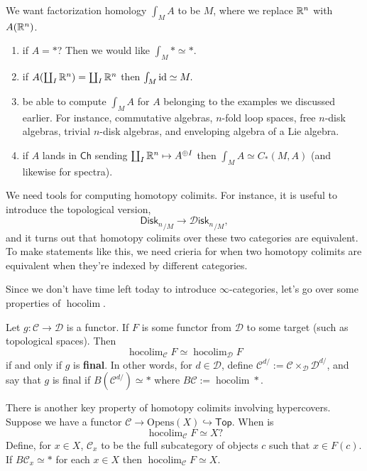 \documentclass{amsart}
\DeclareMathOperator{\hocolim}{hocolim}
\newcommand{\disk}{\mathsf{Disk}_n}
\newcommand{\Disk}{\mathscr{D}\mathsf{isk}_n}
\begin{document}
We want factorization homology $\int_M A$ to be $M$, where we replace $\mathbb{R}^n$
with $A(\mathbb{R}^n)$.
\begin{example}[Desiderata]
    \mbox{}
    \begin{enumerate}
        \item if $A=*$? Then we would like $\int_M* \simeq *$.
        \item if $A(\coprod_I\mathbb{R}^n)=\coprod_I\mathbb{R}^n$ then $\int_M \operatorname{id} \simeq M.$
        \item be able to compute $\int_M A$ for $A$ belonging to the examples
            we discussed earlier. For instance, commutative algebras, $n$-fold
            loop spaces, free $n$-disk algebras, trivial $n$-disk algebras,
            and enveloping algebra of a Lie algebra.
        \item if $A$ lands in $\mathsf{Ch}$ sending $\coprod_I\mathbb{R}^n\mapsto A^{\oplus I}$
            then $\int_M A \simeq C_*(M,A)$ (and likewise for spectra).
    \end{enumerate}
\end{example}

We need tools for computing homotopy colimits. For instance, it is useful to
introduce the topological version,
\begin{equation*}
    {\disk}_{/M} \to {\Disk}_{/M},
\end{equation*}
and it turns out that homotopy colimits over these two categories are equivalent.
To make statements like this, we need crieria for when two homotopy colimits are
equivalent when they're indexed by different categories.

Since we don't have time left today to introduce $\infty$-categories, let's go over some
properties of $\hocolim$.
\begin{theorem}
    Let $g:\mathcal{C}\to \mathcal{D}$ is a functor. If $F$ is some functor from $\mathcal{D}$
    to some target (such as topological spaces). Then
    \begin{equation*}
        \hocolim_{\mathcal{C}}F \simeq \hocolim_{\mathcal{D}} F
    \end{equation*}
    if and only if $g$ is \textbf{final}. In other words, for $d\in\mathcal{D}$,
    define $\mathcal{C}^{d/}:=\mathcal{C}\times_{\mathcal{D}}\mathcal{D}^{d/}$,
    and say that $g$ is final if $B(\mathcal{C}^{d/})\simeq *$ where $B\mathcal{C}:=\hocolim *$.
\end{theorem}

There is another key property of homotopy colimits involving hypercovers. Suppose
we have a functor $\mathcal{C}\to\text{Opens}(X)\hookrightarrow\mathsf{Top}$. When is
\begin{equation*}
    \hocolim_{\mathcal{C}}F\simeq X?
\end{equation*}
Define, for $x\in X$, $\mathcal{C}_x$ to be the full subcategory of objects $c$ such that $x\in F(c)$.
If $B\mathcal{C}_x\simeq *$ for each $x\in X$ then $\hocolim_{\mathcal{C}} F\simeq X$.
\end{document}
